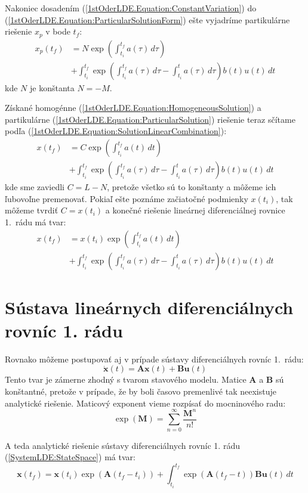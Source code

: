 \documentclass[a4paper, 10pt, ]{article}
\begin{document}
\noindent Nakoniec dosadením (\ref{1stOderLDE.Equation:ConstantVariation}) do (\ref{1stOderLDE.Equation:ParticularSolutionForm}) ešte vyjadríme partikulárne riešenie $x_p$ v bode $t_f$:
\begin{align}
    \label{1stOderLDE.Equation:ParticularSolution}
    \nonumber
    x_p(t_f) &= 
    N \exp \left( \int_{t_i}^{t_f} a(\tau) \, d\tau \right) \\ &+ 
    \int_{t_i}^{t_f} \exp \left( \int_{t_i}^{t_f} a(\tau) \, d\tau - \int_{t_i}^{t} a(\tau) \, d\tau \right) b(t) u(t) \, dt
\end{align}
kde $N$ je konštanta $N = -M$.

Získané homogénne (\ref{1stOderLDE.Equation:HomogeneousSolution}) a partikulárne (\ref{1stOderLDE.Equation:ParticularSolution}) riešenie teraz sčítame podľa (\ref{1stOderLDE.Equation:SolutionLinearCombination}):
\begin{align}
    \nonumber
    x(t_f) &= 
    C \exp \left( \int_{t_i}^{t_f} a(t) \, dt \right) \\ &+
    \int_{t_i}^{t_f} \exp \left( \int_{t_i}^{t_f} a(\tau) \, d\tau - \int_{t_i}^{t} a(\tau) \, d\tau \right) b(t) u(t) \, dt
\end{align}
kde sme zaviedli $C = L - N$, pretože všetko sú to konštanty a môžeme ich ľubovoľne premenovať. Pokiaľ ešte poznáme začiatočné podmienky $x(t_i)$, tak môžeme tvrdiť $C = x(t_i)$ a konečné riešenie lineárnej diferenciálnej rovnice 1.~rádu má tvar:
\begin{align}
    \nonumber
    x(t_f) &= 
    x(t_i) \exp \left( \int_{t_i}^{t_f} a(t) \, dt \right) \\ &+
    \int_{t_i}^{t_f} \exp \left( \int_{t_i}^{t_f} a(\tau) \, d\tau - \int_{t_i}^{t} a(\tau) \, d\tau \right) b(t) u(t) \, dt 
\end{align}



\section{Sústava lineárnych diferenciálnych rovníc 1. rádu}

Rovnako môžeme postupovať aj v prípade sústavy diferenciálnych rovníc 1.~rádu:
\begin{equation}
    \label{SystemLDE:StateSpace}
    \dot{\bm{x}}(t) = \bm{A} \bm{x}(t) + \bm{B} \bm{u}(t)
\end{equation}
Tento tvar je zámerne zhodný s tvarom stavového modelu. Matice $\bm{A}$ a $\bm{B}$ sú konštantné, pretože v prípade, že by boli časovo premenlivé tak neexistuje analytické riešenie. Maticový exponent vieme rozpísať do mocninového radu:
\begin{equation}
    \exp(\bm{M}) = \sum_{n = 0}^{\infty} \frac{\bm{M}^n}{n!}
\end{equation}

A teda analytické riešenie sústavy diferenciálnych rovníc 1. rádu (\ref{SystemLDE:StateSpace}) má tvar:
\begin{equation}
    \bm{x}(t_f) = 
    \bm{x}(t_i) \exp \left( \bm{A} (t_f - t_i) \right) + 
    \int_{t_i}^{t_f} \exp \left( \bm{A} (t_f - t) \right) \bm{B} \bm{u}(t) \, dt 
\end{equation}
\end{document}
